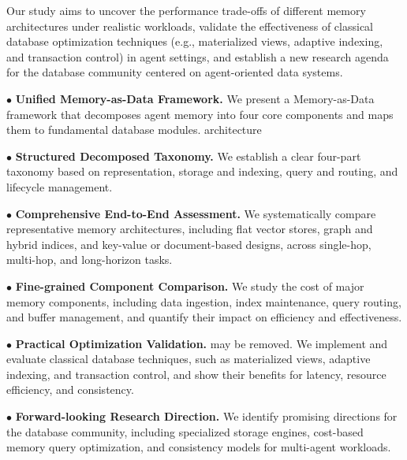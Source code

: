 \documentclass{llmxive}
\providecommand{\zw}[1]{#1}
\begin{document}
Our study aims to uncover the performance trade-offs of different memory architectures under realistic workloads, validate the effectiveness of classical database optimization techniques (e.g., materialized views, adaptive indexing, and transaction control) in agent settings, and establish a new research agenda for the database community centered on agent-oriented data systems.

\noindent $\bullet$ \textbf{Unified Memory-as-Data Framework.}
We present a Memory-as-Data framework that decomposes agent memory into four core components and maps them to fundamental database modules. \zw{architecture}

\noindent $\bullet$ \textbf{Structured Decomposed Taxonomy.}
We establish a clear four-part taxonomy based on representation, storage and indexing, query and routing, and lifecycle management.

\noindent $\bullet$ \textbf{Comprehensive End-to-End Assessment.}
We systematically compare representative memory architectures, including flat vector stores, graph and hybrid indices, and key-value or document-based designs, across single-hop, multi-hop, and long-horizon tasks.

\noindent $\bullet$ \textbf{Fine-grained Component Comparison.}
We study the cost of major memory components, including data ingestion, index maintenance, query routing, and buffer management, and quantify their impact on efficiency and effectiveness.

\noindent $\bullet$ \textbf{Practical Optimization Validation.} \zw{may be removed.}
We implement and evaluate classical database techniques, such as materialized views, adaptive indexing, and transaction control, and show their benefits for latency, resource efficiency, and consistency.

\noindent $\bullet$ \textbf{Forward-looking Research Direction.}
We identify promising directions for the database community, including specialized storage engines, cost-based memory query optimization, and consistency models for multi-agent workloads.



\end{document}
